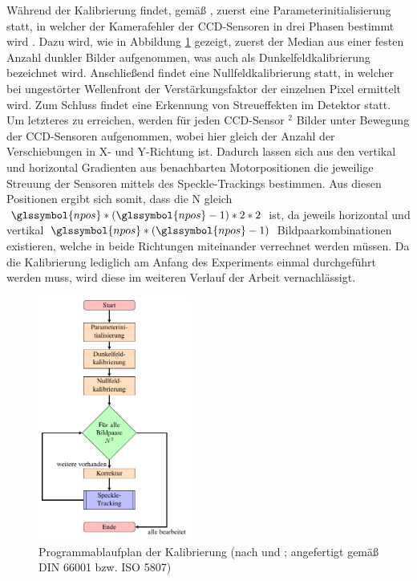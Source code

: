 Während der Kalibrierung findet, gemäß \citeauthor{Ber13}, zuerst eine Parameterinitialisierung statt, in welcher der Kamerafehler der \gls{CCD}-Sensoren in drei Phasen bestimmt wird . Dazu wird, wie in Abbildung \ref{fig:graph_kalibrierung} gezeigt, zuerst der Median aus einer festen Anzahl dunkler Bilder aufgenommen, was auch als Dunkelfeldkalibrierung bezeichnet wird. Anschließend findet eine Nullfeldkalibrierung statt, in welcher bei ungestörter Wellenfront der Verstärkungsfaktor der einzelnen Pixel ermittelt wird. Zum Schluss findet eine Erkennung von Streueffekten im Detektor statt. Um letzteres zu erreichen, werden für jeden \gls{CCD}-Sensor $^2$ Bilder unter Bewegung der \gls{CCD}-Sensoren aufgenommen, wobei  hier gleich der Anzahl der Verschiebungen in X- und Y-Richtung ist. Dadurch lassen sich aus den vertikal und horizontal Gradienten aus benachbarten Motorpositionen die jeweilige Streuung der Sensoren mittels des Speckle-Trackings bestimmen. Aus diesen  Positionen ergibt sich somit, dass die \gls{N} gleich $\glssymbol{npos}*\left(\glssymbol{npos} - 1\right) * 2 * 2$ ist, da jeweils horizontal und vertikal $\glssymbol{npos}*\left(\glssymbol{npos} - 1\right)$ Bildpaarkombinationen existieren, welche in beide Richtungen miteinander verrechnet werden müssen. Da die Kalibrierung lediglich am Anfang des Experiments einmal durchgeführt werden muss, wird diese im weiteren Verlauf der Arbeit vernachlässigt. 

\begin{figure}[htbp]
	\centering
	\includegraphics[width=0.45\textwidth]{pdf/graph_init}
	\caption[Kalibrierung]{Programmablaufplan der Kalibrierung (nach  und \cite{Coj17}; angefertigt gemäß DIN 66001 bzw. ISO 5807)}
	\label{fig:graph_kalibrierung}
\end{figure}

